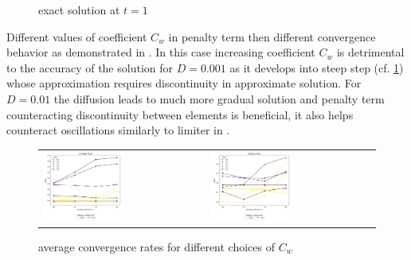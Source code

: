 \begin{example}
\begin{figure}[h]
	\caption{ exact solution at $t = 1$}
	\label{fig:burgess_hesthaven_ext}
\end{figure}
Different values of coefficient $C_w$ in penalty term then different convergence 
behavior as demonstrated in . In this case increasing 
coefficient $C_w$ is detrimental to the accuracy of the solution for $D=0.001$ as it 
develops into steep step (cf. \cref{fig:burgess_hesthaven_ext}) whose approximation 
requires discontinuity in approximate solution. For $D=0.01$ the diffusion leads to much 
more gradual solution and penalty term counteracting discontinuity between elements is 
beneficial, it also helps counteract oscillations similarly to limiter in 
. 
\end{example}


\begin{figure}[h!]
	\centering
	\begin{tabular}{p{} p{}}
		\vspace{0pt} 
		\includegraphics[width=0.49\textwidth]{../figs/parametric/burgers_1D/orders_unlimited}
		&
		\vspace{0pt} 
		\includegraphics[width=0.49\textwidth]{../figs/parametric/burgers_1D/orders_limited}
	\end{tabular}
	\caption{ average convergence rates for different choices of 
	$C_w$}
	\label{fig:burgess_orders}
\end{figure}


